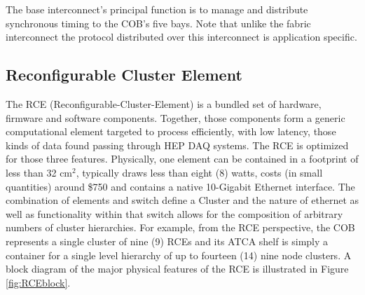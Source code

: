 The base interconnect's principal function is to manage 
and distribute synchronous timing to the COB's five bays.
Note that unlike the fabric interconnect the protocol 
distributed over this interconnect is application specific. 


\subsection{Reconfigurable Cluster Element}
\label{sec:RCE}
The RCE (Reconfigurable-Cluster-Element) is a bundled set of hardware, 
firmware and software components. 
Together, those components form a generic computational element 
targeted to process efficiently, with low latency, those
kinds of data found passing through HEP DAQ systems. 
The RCE is optimized for those three features. 
Physically, one element can be contained in a footprint of less than 32 cm$^2$, 
typically draws less than eight (8) watts, costs (in small quantities) 
around \$750 and contains a native 10-Gigabit Ethernet interface. 
The combination of elements and switch define a Cluster and 
the nature of ethernet as well as functionality within that switch 
allows for the composition of arbitrary numbers of cluster hierarchies. 
For example, from the RCE perspective, the COB represents a single cluster 
of nine (9) RCEs and its ATCA shelf is simply a container for a 
single level hierarchy of up to fourteen (14) nine node clusters. 
A block diagram of the major physical features of the RCE is illustrated in Figure 
\ref{fig:RCEblock}.

